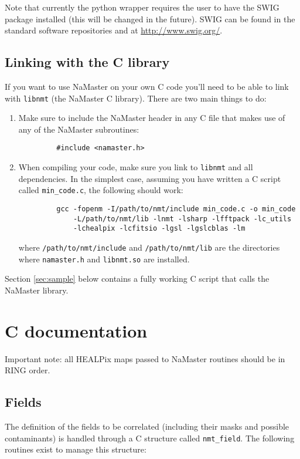 \documentclass[a4paper,10pt]{article}
\begin{document}
Note that currently the python wrapper requires the user to have the SWIG package installed (this will be changed in the future). SWIG can be found in the standard software repositories and at \url{http://www.swig.org/}.

\subsection*{Linking with the C library}
If you want to use NaMaster on your own C code you'll need to be able to link with {\tt libnmt} (the NaMaster C library). There are two main things to do:
\begin{enumerate}
 \item Make sure to include the NaMaster header in any C file that makes use of any of the NaMaster subroutines:
       \begin{verbatim}
         #include <namaster.h>
       \end{verbatim}
 \item When compiling your code, make sure you link to {\tt libnmt} and all dependencies. In the simplest case, assuming you have written a C script called {\tt min\_code.c}, the following should work:
       \begin{verbatim}
         gcc -fopenm -I/path/to/nmt/include min_code.c -o min_code
             -L/path/to/nmt/lib -lnmt -lsharp -lfftpack -lc_utils
             -lchealpix -lcfitsio -lgsl -lgslcblas -lm
       \end{verbatim}
       where {\tt /path/to/nmt/include} and {\tt /path/to/nmt/lib} are the directories where {\tt namaster.h} and {\tt libnmt.so} are installed.
\end{enumerate}
Section \ref{sec:sample} below contains a fully working C script that calls the NaMaster library.

\newpage
\section{C documentation}
Important note: all HEALPix maps passed to NaMaster routines should be in RING order.

\subsection{Fields}
The definition of the fields to be correlated (including their masks and possible contaminants) is handled through a C structure called {\tt nmt\_field}. The following routines exist to manage this structure:
\end{document}
